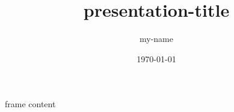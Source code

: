 \documentclass{beamer}
\title{presentation-title}
\author{my-name}
\date{\today}
\begin{document}
\frame{\titlepage}


\begin{frame}
    frame content
\end{frame}
\end{document}

